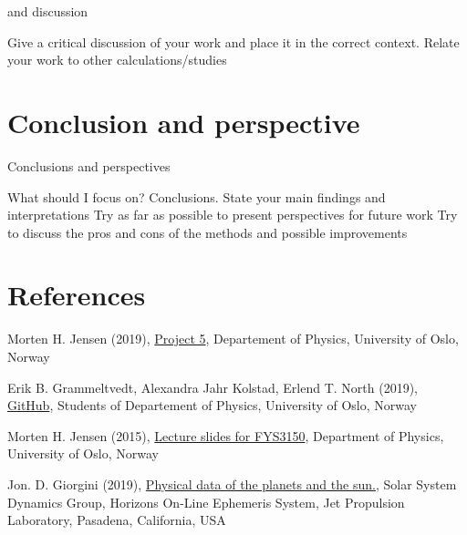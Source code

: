 \documentclass{article}
\begin{document}
 and discussion


 Give a critical discussion of your work and place it in the correct context.
 Relate your work to other calculations/studies

\vspace{1cm}

\section{Conclusion and perspective} \label{sec:Conclusion}

Conclusions and perspectives


What should I focus on? Conclusions.
State your main findings and interpretations
Try as far as possible to present perspectives for future work
Try to discuss the pros and cons of the methods and possible improvements


\vspace{1cm}

\section{References} \label{sec:References}

\begin{thebibliography}{}

Morten H. Jensen (2019), \href{https://github.com/CompPhysics/ComputationalPhysics/blob/master/doc/Projects/2019/Project5/SolarSystem/pdf/SolarSystem.pdf}{Project 5}, Departement of Physics, University of Oslo, Norway

Erik B. Grammeltvedt, Alexandra Jahr Kolstad, Erlend T. North (2019), \href{https://github.com/Erikbgram/Fys3150}{GitHub}, Students of Departement of Physics, University of Oslo, Norway

Morten H. Jensen (2015), \href{https://github.com/CompPhysics/ComputationalPhysics/blob/master/doc/Lectures/lectures2015.pdf}{Lecture slides for FYS3150}, Department of Physics, University of Oslo, Norway

Jon. D. Giorgini (2019), \href{https://ssd.jpl.nasa.gov/horizons.cgi#top}{Physical data of the planets and the sun.}, Solar System Dynamics Group, Horizons On-Line Ephemeris System, Jet Propulsion Laboratory, Pasadena, California, USA


\end{thebibliography}
\end{document}

